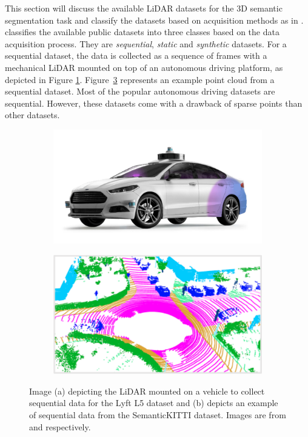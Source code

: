     This section will discuss the available LiDAR datasets for the 3D semantic segmentation task and classify the datasets based on acquisition methods as in \cite{survey3d}.
    \cite{survey3d} classifies the available public datasets into three classes based on the data acquisition process.
    They are \textit{sequential}, \textit{static} and \textit{synthetic} datasets.
    For a sequential dataset, the data is collected as a sequence of frames with a mechanical LiDAR mounted on top of an autonomous driving platform, as depicted in Figure \ref{fig:seq_data_lyft}.
    Figure~\ref{fig:example_sequential} represents an example point cloud from a sequential dataset.
    Most of the popular autonomous driving datasets are sequential. However, these datasets come with a drawback of sparse points than other datasets.
    \begin{figure}[h!]
        \begin{subfigure}{0.45\textwidth}
            \centering
            \includegraphics[scale=0.25]{images/sequential_lyft.png}
            \caption{}
            \label{fig:seq_data_lyft}
        \end{subfigure}
        \begin{subfigure}{0.45\textwidth}
            \centering
            \includegraphics[scale=0.45]{images/SemanticKitti.pdf}
            \caption{}
            \label{fig:example_sequential}
        \end{subfigure}
        \caption{Image (a) depicting the LiDAR mounted on a vehicle to collect sequential data for the Lyft L5 dataset and 
        (b) depicts an example of sequential data from the SemanticKITTI dataset. Images are from \cite{Lyftl5} and \cite{Hu_2020_CVPR_Randla} respectively.}
        
    \end{figure}
    
